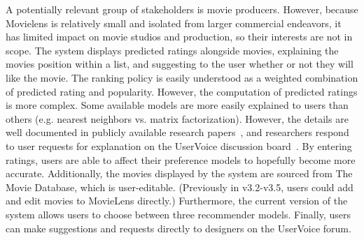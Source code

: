 \documentclass[12pt, a4paper, twocolumn]{article}
\begin{document}
{A potentially relevant group of stakeholders is movie producers. 
However, because Movielens is relatively small and isolated from larger commercial endeavors, it has limited impact on movie studios and production, so their interests are not in scope.
}{%
The system displays predicted ratings alongside movies, explaining the movies position within a list, and suggesting to the user whether or not they will like the movie. 
The ranking policy is easily understood as a weighted combination of predicted rating and popularity.
However, the computation of predicted ratings is more complex. 
Some available models are more easily explained to users than others (e.g. nearest neighbors vs. matrix factorization).
However, the details are well documented in publicly available research papers~\cite{ekstrand2015letting}, and researchers respond to user requests for explanation on the UserVoice discussion board~\cite{explainml}.
}{%
By entering ratings, users are able to affect their preference models to hopefully become more accurate.
Additionally, the movies displayed by the system are sourced from The Movie Database, which is user-editable. 
(Previously in v3.2-v3.5, users could add and edit movies to MovieLens directly.)
Furthermore, the current version of the system allows users to
choose between three recommender models.
Finally, users can make suggestions and requests directly to designers on the UserVoice forum.
}
\end{document}
